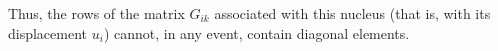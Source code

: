 Thus, the rows of the matrix $G_{ik}$ associated with this nucleus (that is, with its displacement $u_i$) cannot, in any event, contain diagonal elements.
